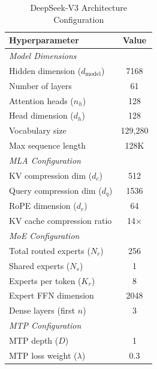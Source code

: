 \begin{table}[htbp]
\centering
\caption{DeepSeek-V3 Architecture Configuration}
\label{tab:architecture-config}
\begin{tabular}{@{}lc@{}}
\toprule
\textbf{Hyperparameter} & \textbf{Value} \\
\midrule
\multicolumn{2}{l}{\textit{Model Dimensions}} \\
Hidden dimension ($d_\text{model}$) & 7168 \\
Number of layers & 61 \\
Attention heads ($n_h$) & 128 \\
Head dimension ($d_h$) & 128 \\
Vocabulary size & 129,280 \\
Max sequence length & 128K \\
\midrule
\multicolumn{2}{l}{\textit{MLA Configuration}} \\
KV compression dim ($d_c$) & 512 \\
Query compression dim ($d_q$) & 1536 \\
RoPE dimension ($d_r$) & 64 \\
KV cache compression ratio & 14$\times$ \\
\midrule
\multicolumn{2}{l}{\textit{MoE Configuration}} \\
Total routed experts ($N_r$) & 256 \\
Shared experts ($N_s$) & 1 \\
Experts per token ($K_r$) & 8 \\
Expert FFN dimension & 2048 \\
Dense layers (first $n$) & 3 \\
\midrule
\multicolumn{2}{l}{\textit{MTP Configuration}} \\
MTP depth ($D$) & 1 \\
MTP loss weight ($\lambda$) & 0.3 \\
\bottomrule
\end{tabular}
\end{table}


